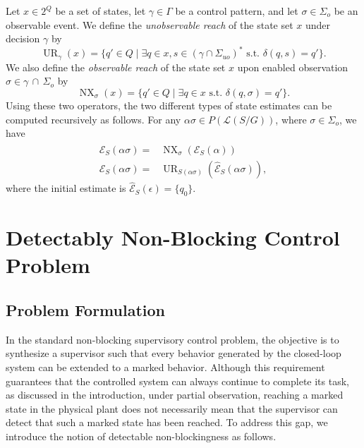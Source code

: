 \documentclass[twocolumn]{autart}
\def \L{\mathcal{L}}
\def \UR{\operatorname{UR}}
\def \NX{\operatorname{NX}}
\begin{document}
Let $x\in 2^Q$ be a set of states, let $\gamma \in \Gamma$ be a control pattern, and let $\sigma\in \Sigma_o$ be an observable event. 
We define the \emph{unobservable reach} of the state set $x$ under decision $\gamma$ by 
\begin{equation}\label{eq:ur}
    \UR_\gamma(x)=\{ q'\in Q\mid \exists q\!\in\! x,s\!\in\! (\gamma\cap\Sigma_{uo})^*\text{ s.t. }\delta(q,s)\!=\!q'  \}.
\end{equation}
We also define the \emph{observable reach} of the state set $x$ upon enabled observation $\sigma \in \gamma \, \cap \, \Sigma_o$ by 
\begin{equation}\label{eq:nx}
    \NX_\sigma(x)=\{ q'\in Q\mid \exists q\!\in\! x \text{ s.t. }\delta(q,\sigma)\!=\!q'  \}.
\end{equation} 
Using these two operators, the two different types of state estimates can be computed recursively as follows. 
For any $\alpha \sigma \in P(\L(S/G))$, where $\sigma\in \Sigma_o$, we have
\begin{align}
\hat{\mathcal{E}}_S(\alpha\sigma)= & \NX_{\sigma}( {\mathcal{E}}_S(\alpha) )\\
    {\mathcal{E}}_S(\alpha\sigma)= & \UR_{S(\alpha\sigma)}( \hat{\mathcal{E}}_S(\alpha\sigma) ), 
\end{align}
where the initial estimate is $\hat{\mathcal{E}}_S(\epsilon)=\{q_0\}$. 

\newpage

\section{Detectably Non-Blocking Control Problem}
\label{sec:prob}

\subsection{Problem Formulation}

In the standard non-blocking supervisory control problem, the objective is to synthesize a supervisor such that every behavior generated by the closed-loop system can be extended to a marked behavior. 
Although this requirement guarantees that the controlled system can always continue to complete its task, as discussed in the introduction, under partial observation, reaching a marked state in the physical plant does not necessarily mean that the supervisor can detect that such a marked state has been reached.
To address this gap, we introduce the notion of detectable non-blockingness as follows.
\medskip 
\end{document}
